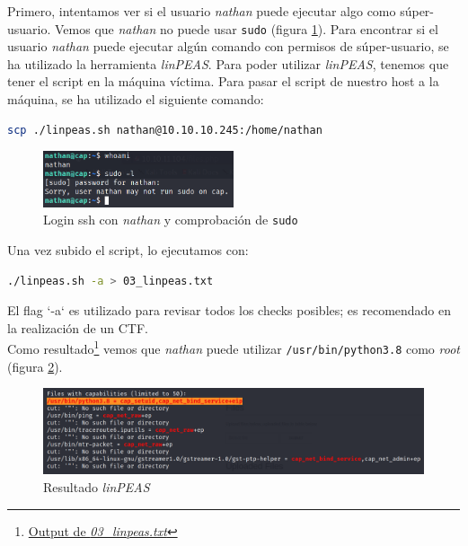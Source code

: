 Primero, intentamos ver si el usuario \textit{nathan} puede ejecutar algo como súper-usuario. Vemos que \textit{nathan} no puede usar \texttt{sudo} (figura \ref{fig:cap-nathan-sudo}). Para encontrar si el usuario \textit{nathan} puede ejecutar algún comando con permisos de súper-usuario, se ha utilizado la herramienta \textit{linPEAS}\cite{peas}. Para poder utilizar \textit{linPEAS}, tenemos que tener el script en la máquina víctima. Para pasar el script de nuestro host a la máquina, se ha utilizado el siguiente comando:
\begin{lstlisting}[language=bash]
scp ./linpeas.sh nathan@10.10.10.245:/home/nathan
\end{lstlisting}

\begin{figure}[h]
    \centering
    \includegraphics[width=0.5\textwidth]{images/machines/cap/nathan-sudo.png}
    \caption{Login \acrshort{ssh} con \textit{nathan} y comprobación de \texttt{sudo}}
    \label{fig:cap-nathan-sudo}
\end{figure}

Una vez subido el script, lo ejecutamos con:
\begin{lstlisting}[language=bash]
./linpeas.sh -a > 03_linpeas.txt
\end{lstlisting}

El flag `-a` es utilizado para revisar todos los checks posibles; es recomendado en la realización de un \acrshort{CTF}.\\

Como resultado\footnote{\href{https://github.com/VictorNS69/TFM/blob/main/machines/cap/03_linpeas.txt}{Output de \textit{03\_linpeas.txt}}} vemos que \textit{nathan} puede utilizar \texttt{/usr/bin/python3.8} como \textit{root} (figura \ref{fig:cap-linpeas}).\\

\begin{figure}[h]
    \centering
    \includegraphics[width=1.0\textwidth]{images/machines/cap/linpeas.png}
    \caption{Resultado \textit{linPEAS}}
    \label{fig:cap-linpeas}
\end{figure}

